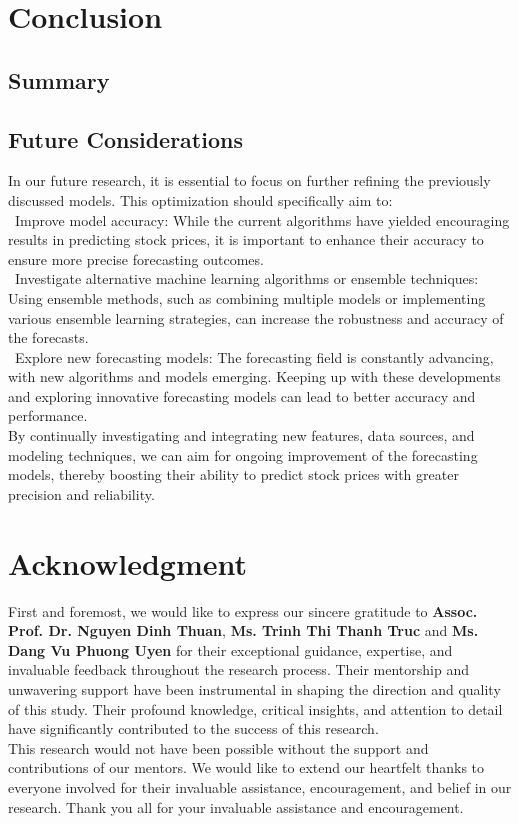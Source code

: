 \documentclass{ieeeojies}
\begin{document}
\section{Conclusion}
\subsection{Summary}


\subsection{Future Considerations}
In our future research, it is essential to focus on further refining the previously discussed models. This optimization should specifically aim to:\\
\indent\textbullet\ Improve model accuracy: While the current algorithms have yielded encouraging results in predicting stock prices, it is important to enhance their accuracy to ensure more precise forecasting outcomes.\\
\indent\textbullet\ Investigate alternative machine learning algorithms or ensemble techniques: Using ensemble methods, such as combining multiple models or implementing various ensemble learning strategies, can increase the robustness and accuracy of the forecasts.\\
\indent\textbullet\ Explore new forecasting models: The forecasting field is constantly advancing, with new algorithms and models emerging. Keeping up with these developments and exploring innovative forecasting models can lead to better accuracy and performance.\\
By continually investigating and integrating new features, data sources, and modeling techniques, we can aim for ongoing improvement of the forecasting models, thereby boosting their ability to predict stock prices with greater precision and reliability.

\section*{Acknowledgment}
First and foremost, we would like to express our sincere gratitude to \textbf{Assoc. Prof. Dr. Nguyen Dinh Thuan}, \textbf{Ms. Trinh Thi Thanh Truc} and \textbf{Ms. Dang Vu Phuong Uyen} for their exceptional guidance, expertise, and invaluable feedback throughout the research process. Their mentorship and unwavering support have been instrumental in shaping the direction and quality of this study. Their profound knowledge, critical insights, and attention to detail have significantly contributed to the success of this research.
\\This research would not have been possible without the support and contributions of our mentors. We would like to extend our heartfelt thanks to everyone involved for their invaluable assistance, encouragement, and belief in our research. Thank you all for your invaluable assistance and encouragement.
\end{document}
